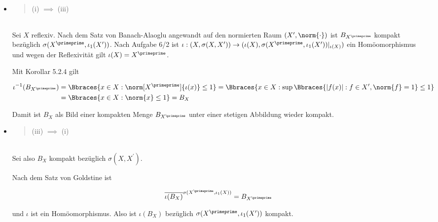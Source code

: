 \begin{solution}

\leavevmode \\


\begin{itemize}

  \item
  \blockquote{(i) $\implies$ (iii)}: \\

  Sei $X$ reflexiv.
  Nach dem Satz von Banach-Alaoglu angewandt auf den normierten Raum $(X^\prime,\norm{\cdot})$ ist $B_{X^\primeprime}$ kompakt bezüglich $\sigma(X^\primeprime, \iota_1(X^\prime))$.
  Nach Aufgabe 6/2 ist $\iota: (X,\sigma(X,X^\prime)) \to (\iota(X), \sigma(X^\primeprime,\iota_1(X^\prime))|_{\iota(X)})$ ein Homöomorphismus und wegen der Reflexivität gilt $\iota(X) = X^\primeprime$.


  Mit Korollar 5.2.4 gilt

  \begin{align*}
    \iota^{-1}(B_{X^\primeprime})
    & =
    \Bbraces
    {
      x \in X:
      \norm[X^\primeprime]{\iota(x)} \leq 1
    }
    =
    \Bbraces
    {
      x \in X:
      \sup \Bbraces
      {
        |f(x)|:
        f \in X^\prime,
        \norm{f} = 1
      }
      \leq 1
    } \\
    & =
    \Bbraces
    {
      x \in X:
      \norm{x} \leq 1
    }
    = B_X
  \end{align*}

  Damit ist $B_X$ als Bild einer kompakten Menge $B_{X^\primeprime}$ unter einer stetigen Abbildung wieder kompakt.

  \item
  \blockquote{(iii) $\implies$ (i)}: \\

  Sei also $B_X$ kompakt bezüglich $\sigma(X, X^\prime)$.


  Nach dem Satz von Goldstine ist

  \begin{align*}
    \overline
    {
      \iota(B_X)}^{\sigma(X^\primeprime, \iota_1(X))
    }
    =
    B_{X^\primeprime}
  \end{align*}

  und $\iota$ ist ein Homöomorphismus.
  Also ist $\iota(B_X)$ bezüglich $\sigma(X^\primeprime, \iota_1(X^\prime))$ kompakt.


\end{itemize}
\end{solution}
